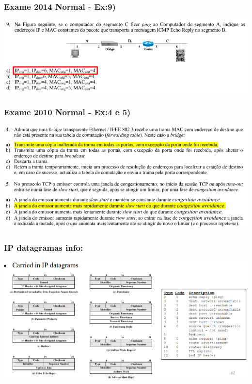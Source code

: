 \documentclass{article}
\begin{document}
\subsubsection{Exame 2014 Normal - Ex:9)}
\begin{center}
    \includegraphics[width=15cm]{images/RCOM52.png}
\end{center}

\subsubsection{Exame 2010 Normal - Ex:4 e 5)}
\begin{center}
    \includegraphics[width=15cm]{images/RCOM54.png}
\end{center}


\subsubsection{IP datagramas info:}
\begin{center}
    \includegraphics[width=15cm]{images/RCOM30.png}
\end{center}
\end{document}
